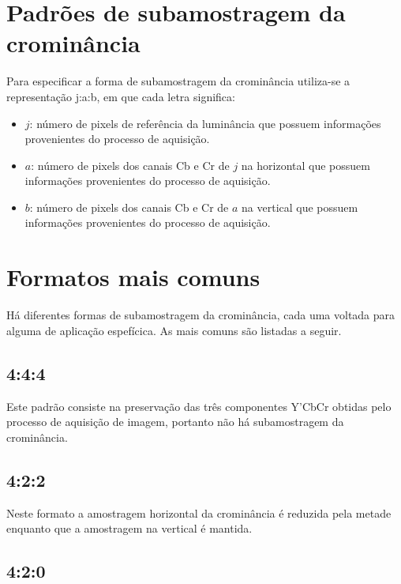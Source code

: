 
\thispagestyle{fancy}
\renewcommand{\thesubsection}{\Alph{section}}
\section{Padrões de subamostragem da  crominância}
\label{cro_diz}

Para especificar a forma de subamostragem da crominância utiliza-se a representação j:a:b, em que cada letra significa:
\begin{itemize}
\item $j$: número de pixels de referência da luminância que possuem informações provenientes do processo de aquisição.
\item $a$: número de pixels dos canais Cb e Cr de $j$ na horizontal que possuem informações provenientes do processo de aquisição.
\item $b$: número de pixels dos canais Cb e Cr de $a$ na vertical que possuem informações provenientes do processo de aquisição.
\end{itemize}

\section{Formatos mais comuns}

Há diferentes formas de subamostragem da crominância, cada uma voltada para alguma de aplicação espefícica. As mais comuns são listadas a seguir.

\subsection{4:4:4}

Este padrão consiste na preservação das três componentes Y'CbCr obtidas pelo processo de aquisição de imagem, portanto não há subamostragem da crominância.

\subsection{4:2:2}

Neste formato a amostragem horizontal da crominância é reduzida pela metade enquanto que a amostragem na vertical é mantida.

\subsection{4:2:0}

